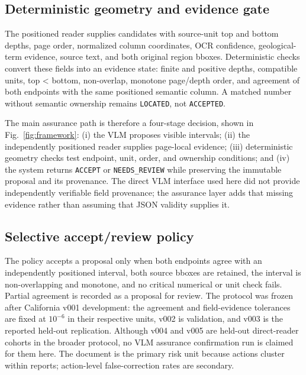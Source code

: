 \documentclass[a4paper,fleqn]{cas-sc}
\begin{document}
\subsection{Deterministic geometry and evidence gate}

The positioned reader supplies candidates with source-unit top and bottom depths, page order, normalized column coordinates, OCR confidence, geological-term evidence, source text, and both original region bboxes. Deterministic checks convert these fields into an evidence state: finite and positive depths, compatible units, top \textless{} bottom, non-overlap, monotone page/depth order, and agreement of both endpoints with the same positioned semantic column. A matched number without semantic ownership remains \texttt{LOCATED}, not \texttt{ACCEPTED}.

The main assurance path is therefore a four-stage decision, shown in Fig.~\ref{fig:framework}: (i) the VLM proposes visible intervals; (ii) the independently positioned reader supplies page-local evidence; (iii) deterministic geometry checks test endpoint, unit, order, and ownership conditions; and (iv) the system returns \texttt{ACCEPT} or \texttt{NEEDS\_REVIEW} while preserving the immutable proposal and its provenance. The direct VLM interface used here did not provide independently verifiable field provenance; the assurance layer adds that missing evidence rather than assuming that JSON validity supplies it.

\subsection{Selective accept/review policy}

The policy accepts a proposal only when both endpoints agree with an independently positioned interval, both source bboxes are retained, the interval is non-overlapping and monotone, and no critical numerical or unit check fails. Partial agreement is recorded as a proposal for review. The protocol was frozen after California v001 development: the agreement and field-evidence tolerances are fixed at \(10^{-6}\) in their respective units, v002 is validation, and v003 is the reported held-out replication. Although v004 and v005 are held-out direct-reader cohorts in the broader protocol, no VLM assurance confirmation run is claimed for them here. The document is the primary risk unit because actions cluster within reports; action-level false-correction rates are secondary.
\end{document}
